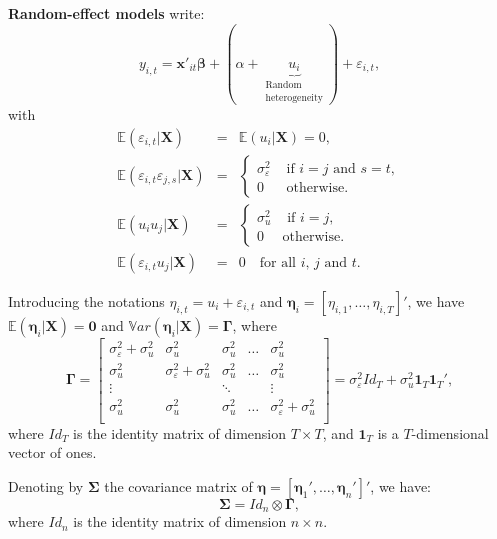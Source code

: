 \documentclass[
  12pt,
]{book}
\theoremstyle{definition}
\theoremstyle{definition}
\theoremstyle{definition}
\theoremstyle{definition}
\theoremstyle{remark}
\begin{document}
\textbf{Random-effect models} write:
\[
y_{i,t}=\mathbf{x}'_{it}\boldsymbol\beta + (\alpha + \underbrace{u_i}_{\substack{\text{Random}\\\text{heterogeneity}}}) + \varepsilon_{i,t},
\]
with
\begin{eqnarray*}
\mathbb{E}(\varepsilon_{i,t}|\mathbf{X})&=&\mathbb{E}(u_{i}|\mathbf{X}) =0,\\
\mathbb{E}(\varepsilon_{i,t}\varepsilon_{j,s}|\mathbf{X}) &=&
\left\{
\begin{array}{cl}
\sigma_\varepsilon^2 & \mbox{ if $i=j$ and $s=t$},\\
0 & \mbox{ otherwise.}
\end{array}
\right.\\
\mathbb{E}(u_{i}u_{j}|\mathbf{X}) &=&
\left\{
\begin{array}{cl}
\sigma_u^2 & \mbox{ if $i=j$},\\
0 & \mbox{otherwise.}
\end{array}
\right.\\
\mathbb{E}(\varepsilon_{i,t}u_{j}|\mathbf{X})&=&0 \quad \text{for all $i$, $j$ and $t$}.
\end{eqnarray*}

Introducing the notations \(\eta_{i,t} = u_i + \varepsilon_{i,t}\) and \(\boldsymbol\eta_i = [\eta_{i,1},\dots,\eta_{i,T}]'\), we have \(\mathbb{E}(\boldsymbol\eta_i |\mathbf{X}) = \mathbf{0}\) and \(\mathbb{V}ar(\boldsymbol\eta_i | \mathbf{X}) = \boldsymbol\Gamma\), where
\[
\boldsymbol\Gamma = \left[  \begin{array}{ccccc}
\sigma_\varepsilon^2+\sigma_u^2 & \sigma_u^2 & \sigma_u^2 & \dots & \sigma_u^2\\
\sigma_u^2 & \sigma_\varepsilon^2+\sigma_u^2 & \sigma_u^2 & \dots & \sigma_u^2\\
\vdots && \ddots && \vdots \\
\sigma_u^2 & \sigma_u^2 & \sigma_u^2 & \dots & \sigma_\varepsilon^2+\sigma_u^2\\
\end{array}
\right] = \sigma_\varepsilon^2Id_T + \sigma_u^2\mathbf{1}_T\mathbf{1}_T',
\]
where \(Id_T\) is the identity matrix of dimension \(T \times T\), and \(\mathbf{1}_T\) is a \(T\)-dimensional vector of ones.

Denoting by \(\boldsymbol\Sigma\) the covariance matrix of \(\boldsymbol\eta = [\boldsymbol\eta_1',\dots,\boldsymbol\eta_n']'\), we have:
\[
\boldsymbol\Sigma = Id_n \otimes \boldsymbol\Gamma,
\]
where \(Id_n\) is the identity matrix of dimension \(n \times n\).
\end{document}

